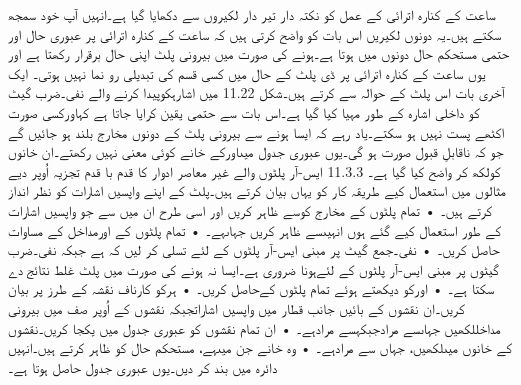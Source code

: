 	ساعت کے کنارہ اترائی کے عمل کو نکتہ دار تیر دار  لکیروں سے دکھایا گیا ہے۔انہیں آپ خود سمجھ سکتے ہیں۔یہ دونوں لکیریں اس بات کو واضح کرتی ہیں کہ ساعت کے کنارہ اترائی پر عبوری حال  اور حتمی مستحکم حال دونوں میں ہوتا ہے۔ہونے کی صورت میں بیرونی پلٹ اپنی حال برقرار رکھتا ہے اور یوں ساعت کے کنارہ اترائی پر ڈی پلٹ کے حال میں کسی قسم کی تبدیلی رو نما نہیں ہوتی۔
	ایک آخری بات اس پلٹ کے حوالہ سے کرتے ہیں۔شکل 11.22 میں اشارہکوپیدا کرنے والے نفی۔ضرب گیٹ کو داخلی اشارہ کے طور مہیا کیا گیا ہے۔اس بات سے حتمی یقین کرایا جاتا ہے کہاورکسی صورت اکٹھے پست نہیں ہو سکتے۔یاد رہے کہ ایسا ہونے سے بیرونی پلٹ کے دونوں مخارج بلند ہو جائیں گے جو کہ ناقابلِ قبول صورت ہو گی۔یوں عبوری جدول میںاورکے خانے کوئی معنی نہیں رکھتے۔ان خانوں کولکھ کر واضح کیا گیا ہے۔
11.3.3 ایس-آر پلٹوں والے غیر معاصر ادوار کا قدم با قدم تجزیہ
	اُوپر دیے مثالوں میں استعمال کیے طریقہ کار کو یہاں بیان کرتے ہیں۔پلٹ کے اپنے واپسیں اشارات کو نظر انداز کرتے ہیں۔
    • تمام پلٹوں کے مخارج کوسے ظاہر کریں اور اسی طرح ان میں سے جو واپسیں اشارات کے طور استعمال کیے گئے ہوں انہیںسے ظاہر کریں جہاںہے۔
    • تمام پلٹوں کے اورمداخل کے مساوات حاصل کریں۔
    • نفی۔جمع گیٹ پر مبنی ایس-آر پلٹوں کے لئے تسلی کر لیں کہ ہے جبکہ نفی۔ضرب گیٹوں پر مبنی ایس-آر پلٹوں کے لئےہونا ضروری ہے۔ایسا نہ ہونے کی صورت میں پلٹ غلط نتائج دے سکتا ہے۔
    • اورکو دیکھتے ہوئے تمام پلٹوں کےحاصل کریں۔
    • ہرکو کارناف نقشہ کے طرز پر بیان کریں۔ان نقشوں کے بائیں جانب قطار میں واپسیں اشاراتجبکہ نقشوں کے اُوپر صف میں بیرونی مداخللکھیں جہاںسے مرادجبکہسے مرادہے۔
    • ان تمام نقشوں کو عبوری جدول میں یکجا کریں۔نقشوں کے خانوں میںلکھیں، جہاں سے مرادہے۔
    • وہ خانے جن میںہے، مستحکم حال کو ظاہر کرتے ہیں۔انہیں دائرہ میں بند کر دیں۔یوں عبوری جدول حاصل ہوتا ہے۔


